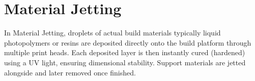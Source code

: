    
   
   

\section{Material Jetting}
In Material Jetting, droplets of actual build materials typically liquid photopolymers or resins are deposited directly  onto the build platform through multiple print heads. Each deposited layer is then instantly cured (hardened) using a UV light, ensuring dimensional stability. Support materials are jetted alongside and later removed once finished.

